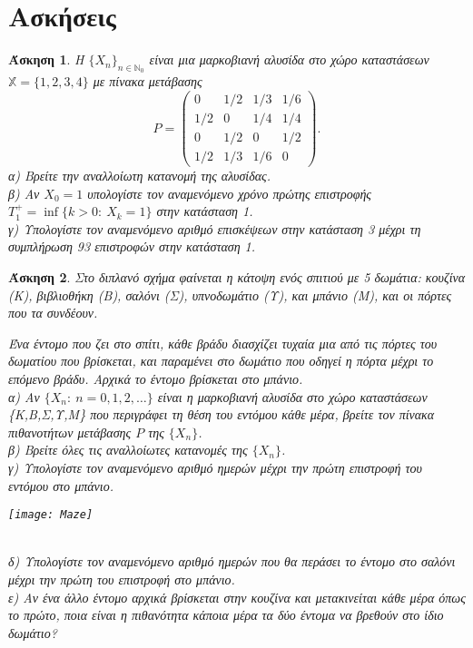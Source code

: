 \documentclass[11pt]{article}
\newtheorem{exercise}{Άσκηση}
\def\N{\mathbb{N}}
\def\X{\mathbb{X}}
\begin{document}
\section{Ασκήσεις}
\begin{exercise}
H $\{X_n\}_{n\in\N_0}$ είναι μια μαρκοβιανή αλυσίδα στο χώρο καταστάσεων $\X=\{1,2,3,4\}$ με πίνακα μετάβασης 
\[
P=\left(\begin{array}{cccc} 0&1/2&1/3&1/6\\1/2&0&1/4&1/4\\0&1/2&0&1/2\\1/2&1/3&1/6&0\end{array}\right).
\] 
α) Βρείτε την αναλλοίωτη κατανομή της αλυσίδας.\\
β) Αν $X_0=1$ υπολογίστε τον αναμενόμενο χρόνο πρώτης επιστροφής $T_1^+=\inf\{k>0:\ X_k=1\}$ στην κατάσταση 1.\\
γ) Υπολογίστε τον αναμενόμενο αριθμό επισκέψεων στην κατάσταση 3 μέχρι τη συμπλήρωση 93 επιστροφών στην κατάσταση 1.
\end{exercise}
\begin{exercise}
Στο διπλανό σχήμα φαίνεται η κάτοψη ενός σπιτιού με 5 δωμάτια: κουζίνα (Κ), βιβλιοθήκη (Β), σαλόνι (Σ), υπνοδωμάτιο (Υ), και μπάνιο (Μ), και οι πόρτες που τα συνδέουν. \\[1mm]
\begin{minipage}[b]{0.72\linewidth}
Ένα έντομο που ζει στο σπίτι, κάθε βράδυ διασχίζει τυχαία μια από τις πόρτες του δωματίου που βρίσκεται, και παραμένει στο δωμάτιο που οδηγεί η πόρτα μέχρι το επόμενο βράδυ. Αρχικά το έντομο βρίσκεται στο μπάνιο.\\
α) Αν $\{X_n:\ n=0,1,2,\ldots\}$ είναι η μαρκοβιανή αλυσίδα στο χώρο καταστάσεων \{Κ,Β,Σ,Υ,Μ\} που περιγράφει τη θέση του εντόμου κάθε μέρα, βρείτε τον πίνακα πιθανοτήτων μετάβασης ${P}$ της $\{X_n\}$.\\
β) Βρείτε όλες τις αναλλοίωτες κατανομές της $\{X_n\}$.\\
γ) Υπολογίστε τον αναμενόμενο αριθμό ημερών μέχρι την πρώτη επιστροφή του εντόμου στο μπάνιο.\\
\end{minipage}
\begin{minipage}[b]{0.26\linewidth}
\texttt{[image: Maze]}
\end{minipage}\\
δ) Υπολογίστε τον αναμενόμενο αριθμό ημερών που θα περάσει το έντομο στο σαλόνι μέχρι την πρώτη του επιστροφή στο μπάνιο.\\
ε) Αν ένα άλλο έντομο αρχικά βρίσκεται στην κουζίνα και μετακινείται κάθε μέρα όπως το πρώτο, ποια είναι η πιθανότητα κάποια μέρα τα δύο έντομα να βρεθούν στο ίδιο δωμάτιο? 
\end{exercise}
\end{document}
